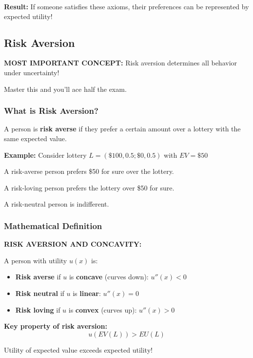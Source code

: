 \documentclass[10pt,letterpaper]{article}
\begin{document}
\textbf{Result:} If someone satisfies these axioms, their preferences can be represented by expected utility!

\subsection{Risk Aversion}

\begin{criticalbox}
\textbf{MOST IMPORTANT CONCEPT:} Risk aversion determines all behavior under uncertainty!

Master this and you'll ace half the exam.
\end{criticalbox}

\subsubsection{What is Risk Aversion?}

A person is \textbf{risk averse} if they prefer a certain amount over a lottery with the same expected value.

\begin{examplebox}
\textbf{Example:} Consider lottery $L = (\$100, 0.5; \$0, 0.5)$ with $EV = \$50$

A risk-averse person prefers \$50 for sure over the lottery.

A risk-loving person prefers the lottery over \$50 for sure.

A risk-neutral person is indifferent.
\end{examplebox}

\subsubsection{Mathematical Definition}

\begin{formulabox}[colback=yellow!20,colframe=orange!80]
\textbf{RISK AVERSION AND CONCAVITY:}

A person with utility $u(x)$ is:
\begin{itemize}
  \item \textbf{Risk averse} if $u$ is \textbf{concave} (curves down): $u''(x) < 0$
  \item \textbf{Risk neutral} if $u$ is \textbf{linear}: $u''(x) = 0$
  \item \textbf{Risk loving} if $u$ is \textbf{convex} (curves up): $u''(x) > 0$
\end{itemize}

\textbf{Key property of risk aversion:}
\[
\boxed{u(EV(L)) > EU(L)}
\]

Utility of expected value exceeds expected utility!
\end{formulabox}
\end{document}
